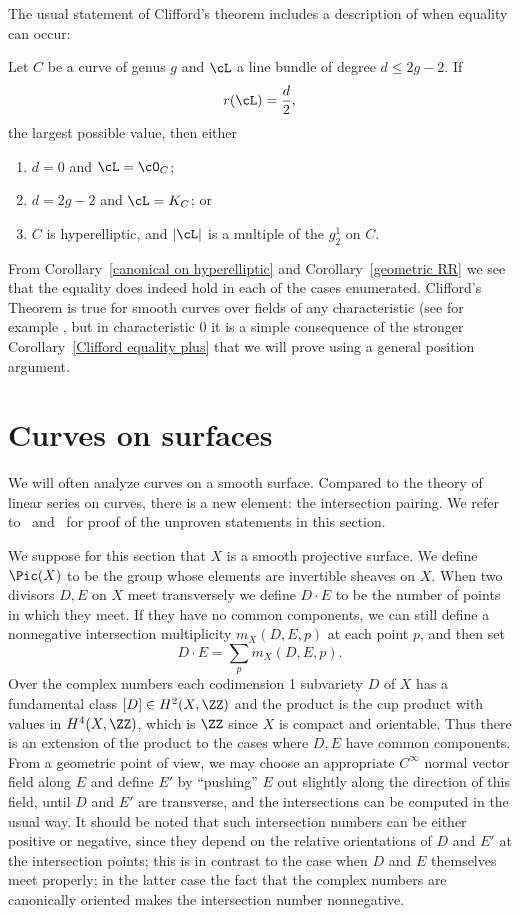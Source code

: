 The usual statement of Clifford's theorem includes a description of when equality can occur:

\begin{theorem}\label{Clifford}\label{Clifford equality}
Let $C$ be a curve of genus $g$ and $\cL$ a line bundle of degree $d \leq 2g-2$. If
$$
r(\cL) = \frac{d}{2},
$$
the largest possible value, then either
\begin{enumerate}
\item $d=0$ and $\cL = \cO_C$;
\item $d = 2g-2$ and $\cL = K_C$; or
\item $C$ is hyperelliptic, and $|\cL|$ is a multiple of the $g^1_2$ on $C$.
\end{enumerate}
\end{theorem}

From Corollary~\ref{canonical on hyperelliptic} and Corollary~\ref{geometric RR} we see that the equality does indeed hold
in each of the cases enumerated. Clifford's Theorem is true for smooth curves over fields of any characteristic (see for example \cite[IV.5.4]{Hartshorne1977}, but in characteristic 0 it is a simple consequence of the stronger 
Corollary~\ref{Clifford equality plus}
that we will prove using a general position argument.


 \section{Curves on surfaces}
 We will often analyze curves  on a smooth surface. Compared to the theory of linear series on curves, there is a new element: the intersection pairing. We refer to~\cite[Chapter V]{Hartshorne1977}
 and~\cite[Chapter I]{Beauville} for proof of the unproven statements in this section.
 
 We suppose for this section that $X$ is a smooth projective surface.
 We define $\Pic(X)$ to be the group whose elements are invertible sheaves on $X$.
When two divisors $D,E$ on $X$ meet transversely we define $D\cdot E$ to be the number of points in which they meet. If they have no common
components, we can still define a nonnegative intersection multiplicity $m_X(D,E,p)$ at each point $p$, and then set
$$
D\cdot E = \sum_p m_X(D,E,p).
$$
Over the complex numbers each codimension 1 subvariety $D$ of $X$ has a fundamental class
$[D]\in H^2(X, \ZZ)$ and the product is the cup product with values in $H^4(X,\ZZ)$, which is $\ZZ$ since $X$ is compact and orientable. Thus
there is an extension of the product to the cases where $D,E$ have common components. From a geometric point of view, we may choose an
appropriate $C^\infty$
normal vector field along $E$ and define $E'$ by ``pushing'' $E$ out slightly along the direction of this field, until $D$ and $E'$ are transverse,
and the intersections can be computed in the usual way. It should be noted that such intersection numbers can be either positive or negative,
since they depend on the relative orientations of $D$ and $E'$ at the intersection points; this is in contrast to the case when $D$ and $E$
themselves meet properly; in the latter case the fact that the complex numbers are canonically oriented makes the intersection number nonnegative.

